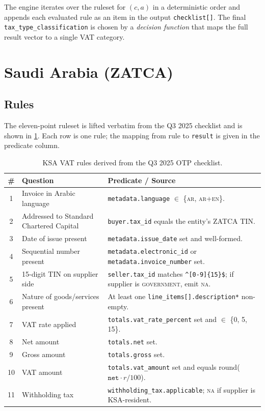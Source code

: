 The engine iterates over the ruleset for $(c,a)$ in a deterministic
order and appends each evaluated rule as an item in the output
\texttt{checklist[]}. The final \texttt{tax\_type\_classification} is
chosen by a \emph{decision function} that maps the full result vector to
a single VAT category.

\section{Saudi Arabia (ZATCA)}

\subsection{Rules}

The eleven-point ruleset is lifted verbatim from the Q3 2025 checklist
and is shown in \cref{tab:ksa-rules}. Each row is one rule; the
mapping from rule to \texttt{result} is given in the predicate column.

\begin{table}[htbp]
\centering
\caption{KSA VAT rules derived from the Q3 2025 OTP checklist.}
\label{tab:ksa-rules}
\footnotesize
\begin{tabularx}{\linewidth}{@{}c l X@{}}
\toprule
\textbf{\#} & \textbf{Question} & \textbf{Predicate / Source} \\ \midrule
1  & Invoice in Arabic language
   & \texttt{metadata.language} $\in$ \{\textsc{ar}, \textsc{ar+en}\}. \\
2  & Addressed to Standard Chartered Capital
   & \texttt{buyer.tax\_id} equals the entity's ZATCA TIN. \\
3  & Date of issue present
   & \texttt{metadata.issue\_date} set and well-formed. \\
4  & Sequential number present
   & \texttt{metadata.electronic\_id} or \texttt{metadata.invoice\_number} set. \\
5  & 15-digit TIN on supplier side
   & \texttt{seller.tax\_id} matches \verb|^[0-9]{15}$|; if supplier is \textsc{government}, emit \textsc{na}. \\
6  & Nature of goods/services present
   & At least one \texttt{line\_items[].description*} non-empty. \\
7  & VAT rate applied
   & \texttt{totals.vat\_rate\_percent} set and $\in$ \{0, 5, 15\}. \\
8  & Net amount
   & \texttt{totals.net} set. \\
9  & Gross amount
   & \texttt{totals.gross} set. \\
10 & VAT amount
   & \texttt{totals.vat\_amount} set and equals round($\texttt{net} \cdot r / 100$). \\
11 & Withholding tax
   & \texttt{withholding\_tax.applicable}; \textsc{na} if supplier is KSA-resident. \\
\bottomrule
\end{tabularx}
\end{table}

